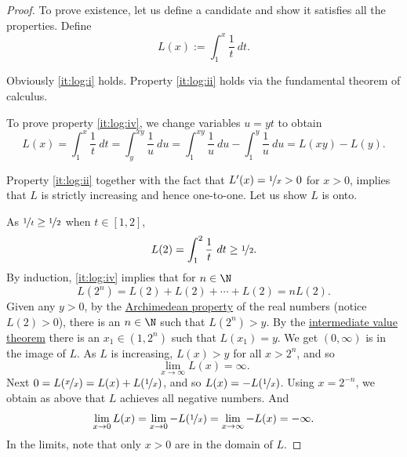\documentclass[12pt]{book}
\begin{document}
\begin{proof}
To prove existence, let us define a candidate and show it satisfies
all the properties.
Define
\begin{equation*}
L(x) := \int_1^x \frac{1}{t}~dt .
\end{equation*}

Obviously \ref{it:log:i} holds.
Property \ref{it:log:ii} holds
via the fundamental theorem of calculus.

To prove property \ref{it:log:iv},
we change variables $u=yt$ to obtain
\begin{equation*}
L(x) =
\int_1^{x} \frac{1}{t}~dt
=
\int_y^{xy} \frac{1}{u}~du
=
\int_1^{xy} \frac{1}{u}~du
-
\int_1^{y} \frac{1}{u}~du
=
L(xy)-L(y) .
\end{equation*}

Property \ref{it:log:ii} together with the fact that $L'(x) = \nicefrac{1}{x} > 0$ 
for $x > 0$, implies that $L$
is strictly increasing and hence one-to-one.
Let us show $L$ is onto.

As $\nicefrac{1}{t} \geq \nicefrac{1}{2}$ when $t \in [1,2]$,
\begin{equation*}
L(2) = \int_1^2 \frac{1}{t} ~dt \geq \nicefrac{1}{2} .
\end{equation*}
By induction, \ref{it:log:iv} implies that for $n \in \N$
\begin{equation*}
L(2^n) = L(2) + L(2) + \cdots + L(2) = n L(2) .
\end{equation*}
Given any $y > 0$, 
by the \hyperref[thm:arch:i]{Archimedean property} of the real numbers
(notice $L(2) > 0$), there is an $n \in \N$ such that
$L(2^n) > y$.
By the
\hyperref[IVT:thm]{intermediate value theorem}
there is an $x_1 \in (1,2^n)$ such that $L(x_1) = y$.
We get
$(0,\infty)$ is in the image of $L$.
As $L$ is increasing, $L(x) > y$ for all $x > 2^n$, and so
\begin{equation*}
\lim_{x\to\infty} L(x) = \infty .
\end{equation*}
Next
$0 = L(\nicefrac{x}{x}) = L(x) + L(\nicefrac{1}{x})$, and
so $L(x) = - L(\nicefrac{1}{x})$.
Using $x=2^{-n}$, we obtain
as above that $L$ achieves all negative numbers.
And
\begin{equation*}
\lim_{x \to 0} L(x) = 
\lim_{x \to 0} -L(\nicefrac{1}{x})
=
\lim_{x \to \infty} -L(x)
=  - \infty .
\end{equation*}
In the limits, note that only $x > 0$ are in the domain of $L$.


\end{proof}
\end{document}
